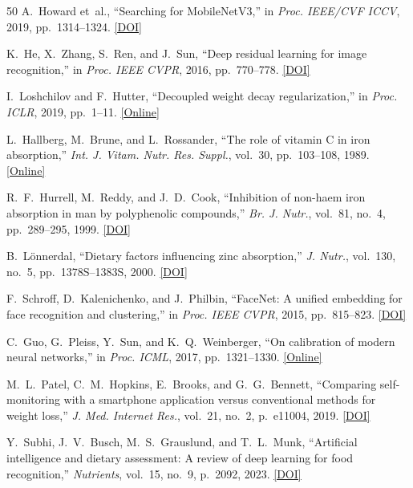 \documentclass[conference]{IEEEtran}
\begin{document}
\begin{thebibliography}{50}
 A.~Howard et~al., ``Searching for MobileNetV3,'' in \emph{Proc. IEEE/CVF ICCV}, 2019, pp.~1314--1324. \href{https://doi.org/10.1109/ICCV.2019.00140}{[DOI]}

 K.~He, X.~Zhang, S.~Ren, and J.~Sun, ``Deep residual learning for image recognition,'' in \emph{Proc. IEEE CVPR}, 2016, pp.~770--778. \href{https://doi.org/10.1109/CVPR.2016.90}{[DOI]}

 I.~Loshchilov and F.~Hutter, ``Decoupled weight decay regularization,'' in \emph{Proc. ICLR}, 2019, pp.~1--11. \href{https://arxiv.org/abs/1711.05101}{[Online]}

 L.~Hallberg, M.~Brune, and L.~Rossander, ``The role of vitamin C in iron absorption,'' \emph{Int. J. Vitam. Nutr. Res. Suppl.}, vol.~30, pp.~103--108, 1989. \href{https://pubmed.ncbi.nlm.nih.gov/2507689/}{[Online]}

 R.~F.~Hurrell, M.~Reddy, and J.~D.~Cook, ``Inhibition of non-haem iron absorption in man by polyphenolic compounds,'' \emph{Br. J. Nutr.}, vol.~81, no.~4, pp.~289--295, 1999. \href{https://doi.org/10.1017/S000711459900053X}{[DOI]}

 B.~L{\"o}nnerdal, ``Dietary factors influencing zinc absorption,'' \emph{J. Nutr.}, vol.~130, no.~5, pp.~1378S--1383S, 2000. \href{https://doi.org/10.1093/jn/130.5.1378S}{[DOI]}

 F.~Schroff, D.~Kalenichenko, and J.~Philbin, ``FaceNet: A unified embedding for face recognition and clustering,'' in \emph{Proc. IEEE CVPR}, 2015, pp.~815--823. \href{https://doi.org/10.1109/CVPR.2015.7298682}{[DOI]}

 C.~Guo, G.~Pleiss, Y.~Sun, and K.~Q.~Weinberger, ``On calibration of modern neural networks,'' in \emph{Proc. ICML}, 2017, pp.~1321--1330. \href{https://arxiv.org/abs/1706.04599}{[Online]}

 M.~L.~Patel, C.~M.~Hopkins, E.~Brooks, and G.~G.~Bennett, ``Comparing self-monitoring with a smartphone application versus conventional methods for weight loss,'' \emph{J. Med. Internet Res.}, vol.~21, no.~2, p.~e11004, 2019. \href{https://doi.org/10.2196/11004}{[DOI]}

 Y.~Subhi, J.~V.~Busch, M.~S.~Grauslund, and T.~L.~Munk, ``Artificial intelligence and dietary assessment: A review of deep learning for food recognition,'' \emph{Nutrients}, vol.~15, no.~9, p.~2092, 2023. \href{https://doi.org/10.3390/nu15092092}{[DOI]}


\end{thebibliography}
\end{document}
